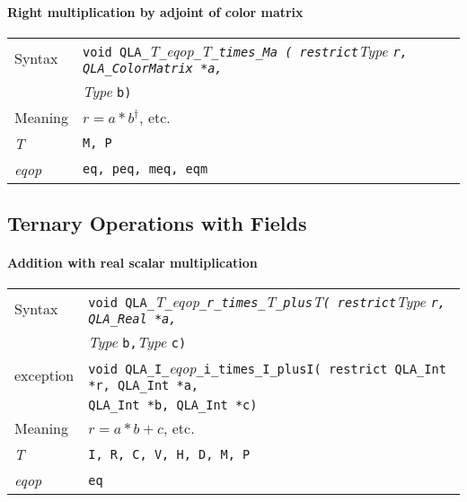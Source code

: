 \documentclass{article}
\newcommand{\tInt}{QLA\ttdash Int }
\newcommand{\tColorMatrix}{QLA\ttdash ColorMatrix }
\newcommand{\tqlaReal}{QLA\ttdash Real }
\newcommand{\tqlaInt}{QLA\ttdash Int }
\newcommand{\namespace}{QLA}
\newcommand{\allEqOps}{{\tt eq, peq, meq, eqm}}
\newcommand{\allNumericTypes}{{\tt I, R, C, V, H, D, M, P}}
\newcommand{\ttdash}{{\tt \_}}
\newcommand{\itt}{\it T}
\newcommand{\extraarg}{}
\begin{document}
\paragraph{Right multiplication by adjoint of color matrix}

\begin{flushleft}
  \begin{tabular}{|l|l|}
  \hline
  Syntax      & {\tt void \namespace}\ttdash\itt\ttdash{\it eqop}\ttdash\itt\ttdash{\tt times}\ttdash{\tt Ma ( restrict}{\it Type }{\tt *r, \tColorMatrix *a, }\\
              & {\it Type }{\tt *b\extraarg)} \\
  \hline
  Meaning     & $r = a * b^\dagger$, etc. \\
  \hline
  \itt        & {\tt M, P} \\
  \hline
  {\it eqop}  & \allEqOps \\
  \hline
  \end{tabular}
\end{flushleft}

\subsection{Ternary Operations with Fields}

\paragraph{Addition with real scalar multiplication}

\begin{flushleft}
  \begin{tabular}{|l|l|}
  \hline
  Syntax      & {{\tt void \namespace}\ttdash\itt\ttdash{\it eqop}\ttdash{\tt r}\ttdash{\tt times}\ttdash\itt\ttdash{\tt plus}\itt{\tt ( restrict}{\it Type }{\tt *r, \tqlaReal *a,}}\\
               & {{\it Type }{\tt *b,}{\it Type }{\tt *c\extraarg)}} \\
  exception    & {\tt void \namespace}\ttdash{\tt I}\ttdash{\it eqop}\ttdash{\tt i}\ttdash{\tt times}\ttdash{\tt I}\ttdash{\tt plus}{\tt I( restrict \tInt *r, \tqlaInt *a,}\\
              & {\tt \tInt *b, \tInt *c\extraarg)} \\
  \hline
  Meaning     & $r = a * b + c$, etc. \\
  \hline
  \itt        & \allNumericTypes \\
  \hline
  {\it eqop}  & {\tt eq} \\
  \hline
  \end{tabular}
\end{flushleft}
\end{document}
